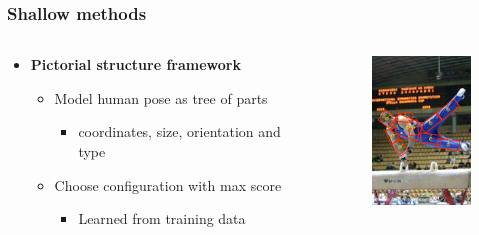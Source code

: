 \documentclass[9pt]{beamer}
\newenvironment{myframe}[1][]{%
\begin{frame}%
\frametitle{#1}
\setcounter{footnote}{0}


}{%
\end{frame}%
}
\begin{document}
\begin{myframe}[Shallow methods]
    \begin{columns}[T]
        \begin{column}{.48\textwidth}
            \begin{itemize}
                \item \textbf{Pictorial structure framework \footnotemark\footnotemark\footnotemark}
              \begin{itemize}
                  \item Model human pose as tree of parts
                  \begin{itemize}
                      \item coordinates, size, orientation and type
                  \end{itemize}
                  \item Choose configuration with max score
                  \begin{itemize}
                      \item Learned from training data
                  \end{itemize}
              \end{itemize}
            \end{itemize}
        \end{column}
        \begin{column}{.48\textwidth}
            \begin{figure}
                \includegraphics[height=150px]{pictoralexample.png}
            \end{figure}
        \end{column}
    \end{columns}
\end{myframe}
\end{document}
